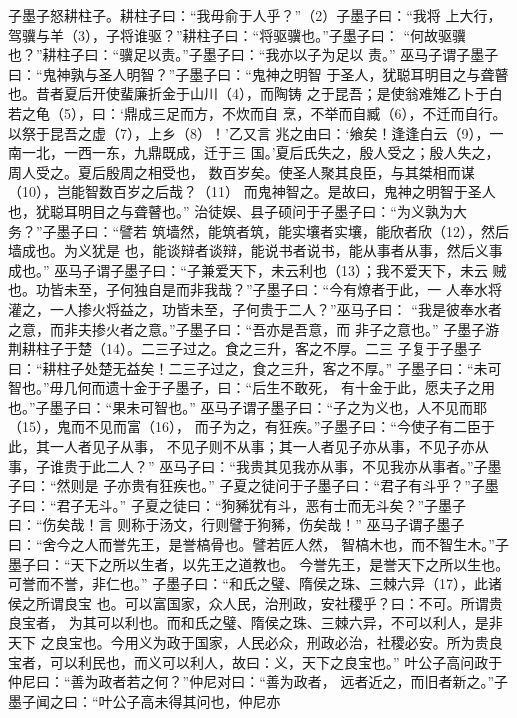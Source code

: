 \documentclass[12pt,UTF8]{ctexbook}
\begin{document}
子墨子怒耕柱子。耕柱子曰：“我毋俞于人乎？”（2）子墨子曰：“我将 
上大行，驾骥与羊（3），子将谁驱？”耕柱子曰：“将驱骥也。”子墨子曰： 
“何故驱骥也？”耕柱子曰：“骥足以责。”子墨子曰：“我亦以子为足以 
责。” 
巫马子谓子墨子曰：“鬼神孰与圣人明智？”子墨子曰：“鬼神之明智 
于圣人，犹聪耳明目之与聋瞽也。昔者夏后开使蜚廉折金于山川（4），而陶铸 
之于昆吾；是使翁难雉乙卜于白若之龟（5），曰：‘鼎成三足而方，不炊而自 
烹，不举而自臧（6），不迁而自行。以祭于昆吾之虚（7），上乡（8）！’乙又言 
兆之由曰：‘飨矣！逢逢白云（9），一南一北，一西一东，九鼎既成，迁于三 
国。’夏后氏失之，殷人受之；殷人失之，周人受之。夏后殷周之相受也， 
数百岁矣。使圣人聚其良臣，与其桀相而谋（10），岂能智数百岁之后哉？（11） 
而鬼神智之。是故曰，鬼神之明智于圣人也，犹聪耳明目之与聋瞽也。” 
治徒娱、县子硕问于子墨子曰：“为义孰为大务？”子墨子曰：“譬若 
筑墙然，能筑者筑，能实壤者实壤，能欣者欣（12），然后墙成也。为义犹是 
也，能谈辩者谈辩，能说书者说书，能从事者从事，然后义事成也。” 
巫马子谓子墨子曰：“子兼爱天下，未云利也（13）；我不爱天下，未云 
贼也。功皆未至，子何独自是而非我哉？”子墨子曰：“今有燎者于此，一 
人奉水将灌之，一人掺火将益之，功皆未至，子何贵于二人？”巫马子曰： 
“我是彼奉水者之意，而非夫掺火者之意。”子墨子曰：“吾亦是吾意，而 
非子之意也。” 
子墨子游荆耕柱子于楚（14）。二三子过之。食之三升，客之不厚。二三 
子复于子墨子曰：“耕柱子处楚无益矣！二三子过之，食之三升，客之不厚。” 
子墨子曰：“未可智也。”毋几何而遗十金于子墨子，曰：“后生不敢死， 
有十金于此，愿夫子之用也。”子墨子曰：“果未可智也。” 
巫马子谓子墨子曰：“子之为义也，人不见而耶（15），鬼而不见而富（16）， 
而子为之，有狂疾。”子墨子曰：“今使子有二臣于此，其一人者见子从事， 
不见子则不从事；其一人者见子亦从事，不见子亦从事，子谁贵于此二人？” 
巫马子曰：“我贵其见我亦从事，不见我亦从事者。”子墨子曰：“然则是 
子亦贵有狂疾也。” 
子夏之徒问于子墨子曰：“君子有斗乎？”子墨子曰：“君子无斗。” 
子夏之徒曰：“狗豨犹有斗，恶有士而无斗矣？”子墨子曰：“伤矣哉！言 
则称于汤文，行则譬于狗豨，伤矣哉！” 
巫马子谓子墨子曰：“舍今之人而誉先王，是誉槁骨也。譬若匠人然， 
智槁木也，而不智生木。”子墨子曰：“天下之所以生者，以先王之道教也。 
今誉先王，是誉天下之所以生也。可誉而不誉，非仁也。” 
子墨子曰：“和氏之璧、隋侯之珠、三棘六异（17），此诸侯之所谓良宝 
也。可以富国家，众人民，治刑政，安社稷乎？曰：不可。所谓贵良宝者， 
为其可以利也。而和氏之璧、隋侯之珠、三棘六异，不可以利人，是非天下 
之良宝也。今用义为政于国家，人民必众，刑政必治，社稷必安。所为贵良 
宝者，可以利民也，而义可以利人，故曰：义，天下之良宝也。” 
叶公子高问政于仲尼曰：“善为政者若之何？”仲尼对曰：“善为政者， 
远者近之，而旧者新之。”子墨子闻之曰：“叶公子高未得其问也，仲尼亦 
\end{document}
